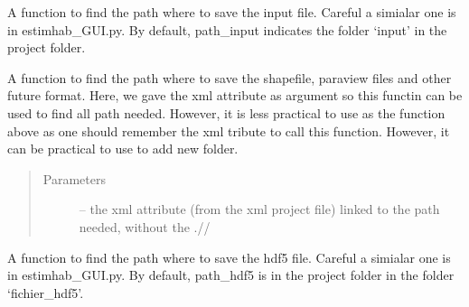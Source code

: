 \documentclass[letterpaper,10pt,english]{sphinxmanual}
\begin{document}
\begin{fulllineitems}
\begin{fulllineitems}
\begin{quote}
\begin{description}
\end{description}\end{quote}

\end{fulllineitems}


\begin{fulllineitems}
\label{\detokenize{index:src_GUI.estimhab_GUI.StatModUseful.find_path_input_est}}
A function to find the path where to save the input file. Careful a simialar one is in estimhab\_GUI.py. By default,
path\_input indicates the folder `input' in the project folder.

\end{fulllineitems}


\begin{fulllineitems}
\label{\detokenize{index:src_GUI.estimhab_GUI.StatModUseful.find_path_output_est}}
A function to find the path where to save the shapefile, paraview files and other future format. Here, we gave
the xml attribute as argument so this functin can be used to find all path needed. However, it is less practical
to use as the function above as one should remember the xml tribute to call this function. However, it can be
practical to use to add new folder.
\begin{quote}\begin{description}
\item[{Parameters}] \leavevmode
{} -- the xml attribute (from the xml project file) linked to the path needed, without the .//

\end{description}\end{quote}

\end{fulllineitems}


\begin{fulllineitems}
\label{\detokenize{index:src_GUI.estimhab_GUI.StatModUseful.find_path_text_est}}
A function to find the path where to save the hdf5 file. Careful a simialar one is in estimhab\_GUI.py. By default,
path\_hdf5 is in the project folder in the folder `fichier\_hdf5'.


\end{fulllineitems}
\end{fulllineitems}
\end{document}
